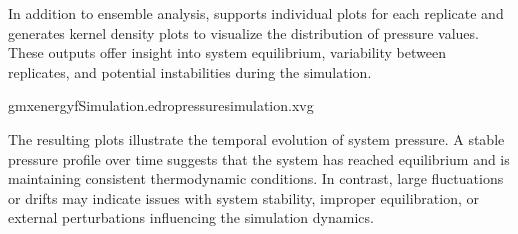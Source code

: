 \documentclass[a4paper,10pt,english]{sphinxmanual}
\let\sphinxpxdimen\pdfpxdimen\else\newdimen\sphinxpxdimen
\begin{document}
\sphinxAtStartPar
In addition to ensemble analysis,  supports individual plots for each replicate and generates kernel density plots to visualize the distribution of pressure values. These outputs offer insight into system equilibrium, variability between replicates, and potential instabilities during the simulation.

\sphinxAtStartPar
{}

\begin{sphinxVerbatim}[commandchars=\\\{\}]
gmxenergy\PYGZhy{}fSimulation.edr\PYGZhy{}opressure\PYGZus{}simulation.xvg
\end{sphinxVerbatim}

\begin{sphinxVerbatim}[commandchars=\\\{\}]
   
\end{sphinxVerbatim}

\noindent{}

\sphinxAtStartPar
{} The resulting plots illustrate the temporal evolution of system pressure. A stable pressure profile over time suggests that the system has reached equilibrium and is maintaining consistent thermodynamic conditions. In contrast, large fluctuations or drifts may indicate issues with system stability, improper equilibration, or external perturbations influencing the simulation dynamics.

\begin{sphinxVerbatim}[commandchars=\\\{\}]
  
\end{sphinxVerbatim}

\noindent{\hspace*{\fill}\sphinxincludegraphics[width=500\sphinxpxdimen]{{Pressure_density}.png}\hspace*{\fill}}
\end{document}
